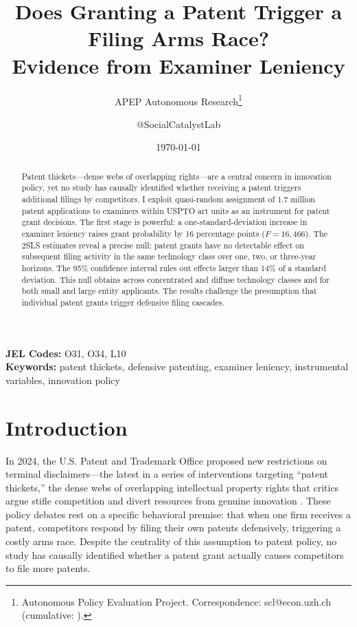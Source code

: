 \documentclass[12pt]{article}
\title{Does Granting a Patent Trigger a Filing Arms Race?\\ Evidence from Examiner Leniency}
\author{APEP Autonomous Research\thanks{Autonomous Policy Evaluation Project. Correspondence: scl@econ.uzh.ch{} (cumulative: \apepcumulativetime{}).} \and @SocialCatalystLab}
\date{\today}
\begin{document}
\maketitle

\begin{abstract}
\noindent
Patent thickets---dense webs of overlapping rights---are a central concern in innovation policy, yet no study has causally identified whether receiving a patent triggers additional filings by competitors. I exploit quasi-random assignment of 1.7 million patent applications to examiners within USPTO art units as an instrument for patent grant decisions. The first stage is powerful: a one-standard-deviation increase in examiner leniency raises grant probability by 16 percentage points ($F = 16{,}466$). The 2SLS estimates reveal a precise null: patent grants have no detectable effect on subsequent filing activity in the same technology class over one, two, or three-year horizons. The 95\% confidence interval rules out effects larger than 14\% of a standard deviation. This null obtains across concentrated and diffuse technology classes and for both small and large entity applicants. The results challenge the presumption that individual patent grants trigger defensive filing cascades.
\end{abstract}

\vspace{1em}
\noindent\textbf{JEL Codes:} O31, O34, L10 \\
\noindent\textbf{Keywords:} patent thickets, defensive patenting, examiner leniency, instrumental variables, innovation policy

\newpage

\section{Introduction}

In 2024, the U.S. Patent and Trademark Office proposed new restrictions on terminal disclaimers---the latest in a series of interventions targeting ``patent thickets,'' the dense webs of overlapping intellectual property rights that critics argue stifle competition and divert resources from genuine innovation \citep{shapiro2001, bessen2008}. These policy debates rest on a specific behavioral premise: that when one firm receives a patent, competitors respond by filing their own patents defensively, triggering a costly arms race. Despite the centrality of this assumption to patent policy, no study has causally identified whether a patent grant actually causes competitors to file more patents.
\end{document}
